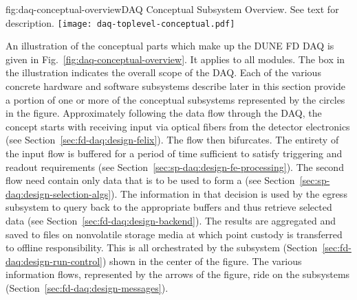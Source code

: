 \begin{dunefigure}{fig:daq-conceptual-overview}{DAQ Conceptual
    Subsystem Overview.  See text for description.}
  \texttt{[image: daq-toplevel-conceptual.pdf]}
\end{dunefigure}


An illustration of the conceptual parts which make up the DUNE FD DAQ is given in Fig.~\ref{fig:daq-conceptual-overview}. 
It applies to all  modules. 
The box in the illustration indicates the overall scope of the DAQ.
Each of the various concrete hardware and software subsystems describe later in this section provide a portion of one or more of the conceptual subsystems represented by the circles in the figure.
Approximately following the data flow through the DAQ, the concept starts with receiving input via optical fibers from the detector electronics (see Section~\ref{sec:fd-daq:design-felix}). 
The flow then bifurcates. 
The entirety of the input flow is buffered for a period of time sufficient to satisfy triggering and readout requirements (see Section~\ref{sec:sp-daq:design-fe-processing}). 
The second flow need contain only data that is to be used to form a  (see Section~\ref{sec:sp-daq:design-selection-algs}).
The information in that decision is used by the egress subsystem to query back to the appropriate buffers and thus retrieve selected data (see Section~\ref{sec:fd-daq:design-backend}).
The results are aggregated and saved to files on nonvolatile storage media at which point custody is transferred to offline responsibility.
This is all orchestrated by the  subsystem (Section~\ref{sec:fd-daq:design-run-control}) shown in the center of the figure.   The various information flows, represented by the arrows of the figure, ride on the  subsystems (Section~\ref{sec:fd-daq:design-messages}). 


